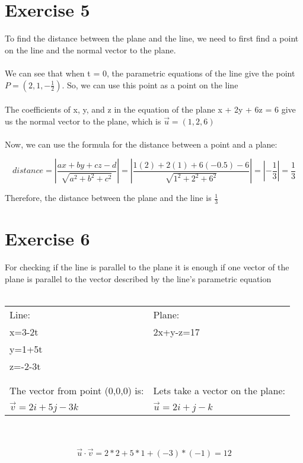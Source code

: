 \documentclass{article}
\begin{document}
\section*{Exercise 5}
To find the distance between the plane and the line, we need to first find a point on the line and the normal vector to the plane. 
\\\\
We can see that when t = 0, the parametric equations of the line give the point $P=(2, 1, -\frac{1}{2})$. So, we can use this point as a point on the line
\\\\
The coefficients of x, y, and z in the equation of the plane x + 2y + 6z = 6 give us the normal vector to the plane, which is $\vec{u}=(1, 2, 6)$
\\\\
Now, we can use the formula for the distance between a point and a plane:

$$distance = |\frac{ax + by + cz - d}{\sqrt{a^2 + b^2 + c^2}}| = |\frac{1(2) + 2(1) + 6(-0.5) - 6}{\sqrt{1^2 + 2^2 + 6^2}}| = |-\frac{1}{3}| = \frac{1}{3}$$

Therefore, the distance between the plane and the line is $\frac{1}{3}$ 

\section*{Exercise 6}
For checking if the line is parallel to the plane it is enough if one vector of the plane is parallel to the vector described by the line's parametric equation
\\
\\
\begin{tabularx}{\textwidth}{X | X}
    Line:   & Plane:    \\ 
    x=3-2t  & 2x+y-z=17 \\
    y=1+5t              \\
    z=-2-3t             \\
                        \\
                        \\
    The vector from point (0,0,0) is: &Lets take a vector on the plane: \\
    $\vec{v}=2i+5j-3k$  & $\vec{u}=2i+j-k$    
\end{tabularx}
\\
\\
$$\vec{u}\cdot\vec{v} = 2*2+5*1+(-3)*(-1)= 12 $$
\newpage
\end{document}
